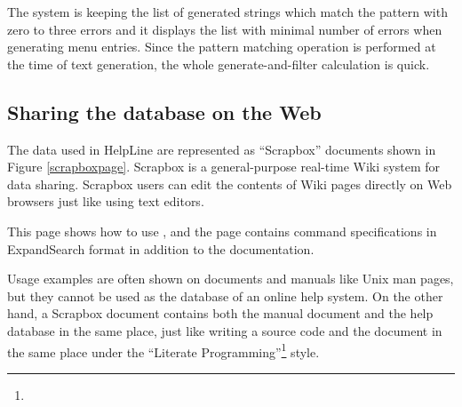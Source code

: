 \documentclass[manuscript,screen,review]{acmart}
\def\HL{\textsf{HelpLine}}
\def\ES{\textsf{ExpandSearch}}
\def\SB{\textsf{Scrapbox}}
\begin{document}
The system is keeping the list of generated strings
which match the pattern with zero to three errors
and it displays the list with minimal number of errors
when generating menu entries.
% 
Since the pattern matching operation is performed at the time of text generation,
the whole generate-and-filter calculation is quick.



\subsection{Sharing the database on the Web}

The data used in {\HL} are represented as ``{\SB}'' documents
shown in Figure \ref{scrapboxpage}.
%
{\SB} is a general-purpose real-time Wiki system for data sharing.
{\SB} users can edit the contents of Wiki pages directly
on Web browsers just like using text editors.


This page shows how to use , and
the page contains command specifications in {\ES} format
in addition to the documentation.


Usage examples are often shown on documents and manuals like Unix man pages,
but they cannot be used as the database of an online help system.
On the other hand,
a {\SB} document contains both the manual document and the help database
in the same place, just like
writing a source code and the document in the same place
under the ``Literate Programming''\footnote{
} style.
\end{document}
